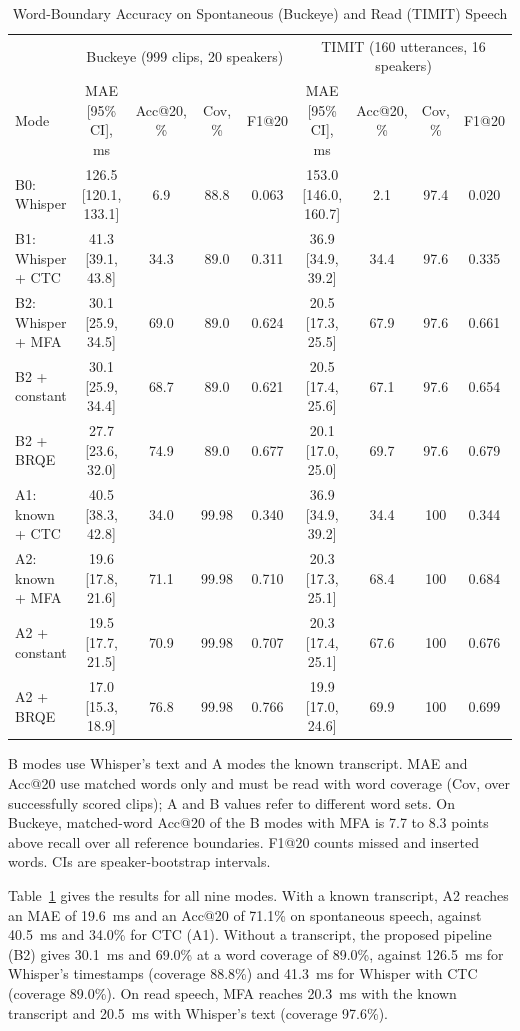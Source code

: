 \documentclass[conference,a4paper]{IEEEtran}
\begin{document}
\begin{table}[t]
\caption{Word-Boundary Accuracy on Spontaneous (Buckeye) and Read (TIMIT) Speech}
\label{tab:main}
\centering
\footnotesize
\begin{tabular}{lcccc@{\qquad}cccc}
\toprule
& \multicolumn{4}{c}{Buckeye (999 clips, 20 speakers)} & \multicolumn{4}{c}{TIMIT (160 utterances, 16 speakers)}\\
Mode & MAE [95\% CI], ms & Acc@20, \% & Cov, \% & F1@20 & MAE [95\% CI], ms & Acc@20, \% & Cov, \% & F1@20\\
\midrule
B0: Whisper & 126.5 [120.1, 133.1] & 6.9 & 88.8 & 0.063 & 153.0 [146.0, 160.7] & 2.1 & 97.4 & 0.020\\
B1: Whisper + CTC & 41.3 [39.1, 43.8] & 34.3 & 89.0 & 0.311 & 36.9 [34.9, 39.2] & 34.4 & 97.6 & 0.335\\
B2: Whisper + MFA & 30.1 [25.9, 34.5] & 69.0 & 89.0 & 0.624 & 20.5 [17.3, 25.5] & 67.9 & 97.6 & 0.661\\
B2 + constant & 30.1 [25.9, 34.4] & 68.7 & 89.0 & 0.621 & 20.5 [17.4, 25.6] & 67.1 & 97.6 & 0.654\\
B2 + BRQE & 27.7 [23.6, 32.0] & 74.9 & 89.0 & 0.677 & 20.1 [17.0, 25.0] & 69.7 & 97.6 & 0.679\\
\midrule
A1: known + CTC & 40.5 [38.3, 42.8] & 34.0 & 99.98 & 0.340 & 36.9 [34.9, 39.2] & 34.4 & 100 & 0.344\\
A2: known + MFA & 19.6 [17.8, 21.6] & 71.1 & 99.98 & 0.710 & 20.3 [17.3, 25.1] & 68.4 & 100 & 0.684\\
A2 + constant & 19.5 [17.7, 21.5] & 70.9 & 99.98 & 0.707 & 20.3 [17.4, 25.1] & 67.6 & 100 & 0.676\\
A2 + BRQE & 17.0 [15.3, 18.9] & 76.8 & 99.98 & 0.766 & 19.9 [17.0, 24.6] & 69.9 & 100 & 0.699\\
\bottomrule
\end{tabular}

\parbox{0.94\textwidth}{\scriptsize B modes use Whisper's text and A modes the known transcript. MAE and Acc@20 use matched words only and must be read with word coverage (Cov, over successfully scored clips); A and B values refer to different word sets. On Buckeye, matched-word Acc@20 of the B modes with MFA is 7.7 to 8.3 points above recall over all reference boundaries. F1@20 counts missed and inserted words. CIs are speaker-bootstrap intervals.}
\end{table}

Table~\ref{tab:main} gives the results for all nine modes. With a known transcript, A2 reaches an MAE of 19.6~ms and an Acc@20 of 71.1\% on spontaneous speech, against 40.5~ms and 34.0\% for CTC (A1). Without a transcript, the proposed pipeline (B2) gives 30.1~ms and 69.0\% at a word coverage of 89.0\%, against 126.5~ms for Whisper's timestamps (coverage 88.8\%) and 41.3~ms for Whisper with CTC (coverage 89.0\%). On read speech, MFA reaches 20.3~ms with the known transcript and 20.5~ms with Whisper's text (coverage 97.6\%).
\end{document}
